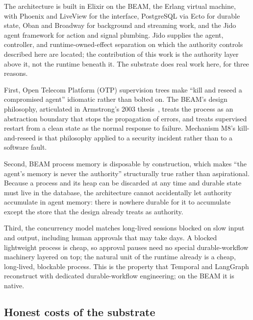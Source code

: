 \documentclass[11pt,letterpaper]{article}
\begin{document}
The architecture is built in Elixir on the BEAM, the Erlang virtual machine, with Phoenix and LiveView for the interface, PostgreSQL via Ecto for durable state, Oban and Broadway for background and streaming work, and the Jido agent framework for action and signal plumbing. Jido supplies the agent, controller, and runtime-owned-effect separation on which the authority controls described here are located; the contribution of this work is the authority layer above it, not the runtime beneath it. The substrate does real work here, for three reasons.

First, Open Telecom Platform (OTP) supervision trees make ``kill and reseed a compromised agent'' idiomatic rather than bolted on. The BEAM's design philosophy, articulated in Armstrong's 2003 thesis~\cite{armstrong2003}, treats the process as an abstraction boundary that stops the propagation of errors, and treats supervised restart from a clean state as the normal response to failure. Mechanism M8's kill-and-reseed is that philosophy applied to a security incident rather than to a software fault.

Second, BEAM process memory is disposable by construction, which makes ``the agent's memory is never the authority'' structurally true rather than aspirational. Because a process and its heap can be discarded at any time and durable state must live in the database, the architecture cannot accidentally let authority accumulate in agent memory: there is nowhere durable for it to accumulate except the store that the design already treats as authority.

Third, the concurrency model matches long-lived sessions blocked on slow input and output, including human approvals that may take days. A blocked lightweight process is cheap, so approval pauses need no special durable-workflow machinery layered on top; the natural unit of the runtime already is a cheap, long-lived, blockable process. This is the property that Temporal and LangGraph reconstruct with dedicated durable-workflow engineering; on the BEAM it is native.

\subsection{Honest costs of the substrate}\label{sec:beam-costs}
\end{document}
